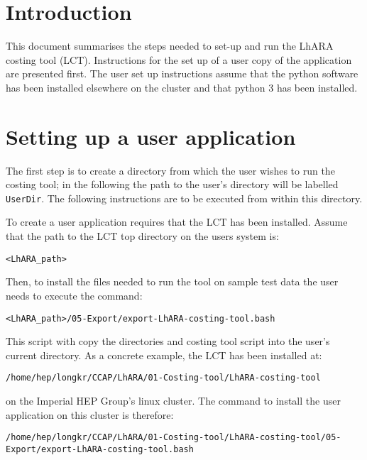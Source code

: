 \section*{\color{RedViolet} Introduction}
This document summarises the steps needed to set-up and run the LhARA
costing tool (LCT).
Instructions for the set up of a user copy of the application are
presented first.
The user set up instructions assume that the python software has been
installed elsewhere on the cluster and that python 3 has been
installed.

\vskip 0.5cm
\noindent{\color{DarkYellow} \rule[0mm]{\textwidth}{0.43pt}}

\section*{\color{RedViolet} Setting up a user application}
The first step is to create a directory from which the user wishes to
run the costing tool; in the following the path to the user's
directory will be labelled {\tt UserDir}.
The following instructions are to be executed from within this
directory.

To create a user application requires that the LCT has been
installed.
Assume that the path to the LCT top directory on the users system is:
\begin{center}
  {\tt <LhARA\_path>}
\end{center}
Then, to install the files needed to run the tool on sample test data
the user needs to execute the command:
\begin{center}
  {\tt <LhARA\_path>/05-Export/export-LhARA-costing-tool.bash}
\end{center}
This script with copy the directories and costing tool script into the
user's current directory.
As a concrete example, the LCT has been installed at:
\begin{center}
  {\tt /home/hep/longkr/CCAP/LhARA/01-Costing-tool/LhARA-costing-tool}
\end{center}
on the Imperial HEP Group's linux cluster.
The command to install the user application on this cluster is
therefore:
\begin{center}
  {\tt\tiny /home/hep/longkr/CCAP/LhARA/01-Costing-tool/LhARA-costing-tool/05-Export/export-LhARA-costing-tool.bash}
\end{center}

